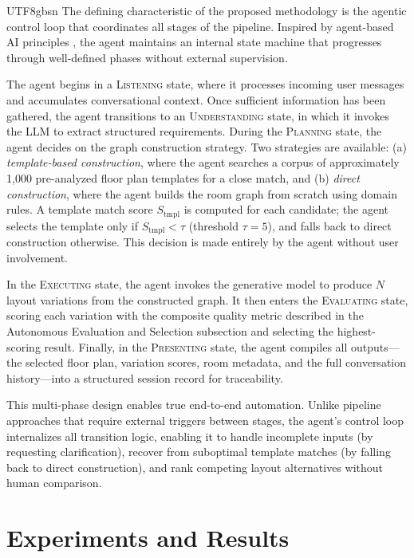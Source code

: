 \documentclass[11pt]{article}
\let\cite\citep
\providecommand\citep{\cite}
\begin{document}
\begin{CJK}{UTF8}{gbsn}
The defining characteristic of the proposed methodology is the agentic control loop that coordinates all stages of the pipeline. Inspired by agent-based AI principles \cite{b21}, the agent maintains an internal state machine that progresses through well-defined phases without external supervision.

The agent begins in a \textsc{Listening} state, where it processes incoming user messages and accumulates conversational context. Once sufficient information has been gathered, the agent transitions to an \textsc{Understanding} state, in which it invokes the LLM to extract structured requirements. During the \textsc{Planning} state, the agent decides on the graph construction strategy. Two strategies are available: (a) \textit{template-based construction}, where the agent searches a corpus of approximately 1,000 pre-analyzed floor plan templates for a close match, and (b) \textit{direct construction}, where the agent builds the room graph from scratch using domain rules. A template match score $S_{\mathrm{tmpl}}$ is computed for each candidate; the agent selects the template only if $S_{\mathrm{tmpl}} < \tau$ (threshold $\tau = 5$), and falls back to direct construction otherwise. This decision is made entirely by the agent without user involvement.

In the \textsc{Executing} state, the agent invokes the generative model to produce $N$ layout variations from the constructed graph. It then enters the \textsc{Evaluating} state, scoring each variation with the composite quality metric described in the Autonomous Evaluation and Selection subsection and selecting the highest-scoring result. Finally, in the \textsc{Presenting} state, the agent compiles all outputs---the selected floor plan, variation scores, room metadata, and the full conversation history---into a structured session record for traceability.

This multi-phase design enables true end-to-end automation. Unlike pipeline approaches that require external triggers between stages, the agent's control loop internalizes all transition logic, enabling it to handle incomplete inputs (by requesting clarification), recover from suboptimal template matches (by falling back to direct construction), and rank competing layout alternatives without human comparison.

\section*{Experiments and Results}


\end{CJK}
\end{document}
